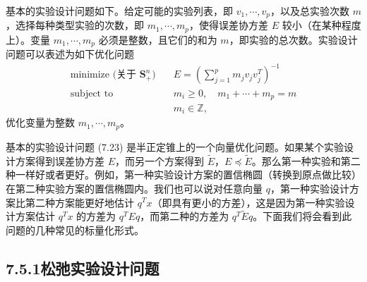 \documentclass[UTF8,12pt,a4paper,fontset=fandol]{ctexart}
\begin{document}
基本的实验设计问题如下。给定可能的实验列表，即 $v_1,\cdots,v_p$，以及总实验次数 $m$，选择每种类型实验的次数，即 $m_1,\cdots,m_p$，使得误差协方差 $E$ 较小（在某种程度上）。变量 $m_1,\cdots,m_p$ 必须是整数，且它们的和为 $m$，即实验的总次数。实验设计问题可以表述为如下优化问题
\begin{equation}
\begin{aligned}
\text{minimize (关于 $\mathbf{S}_+^n$)}\quad & E=\left(\sum_{j=1}^p m_jv_jv_j^T\right)^{-1}\\
\text{subject to}\quad & m_i\geq 0,\quad m_1+\cdots+m_p=m\\
& m_i\in\mathbb{Z},
\end{aligned}
\tag{7.23}
\end{equation}
优化变量为整数 $m_1,\cdots,m_p$。

基本的实验设计问题 (7.23) 是半正定锥上的一个向量优化问题。如果某个实验设计方案得到误差协方差 $E$，而另一个方案得到 $\tilde{E}$，$E\preceq \tilde{E}$。那么第一种实验和第二种一样好或者更好。例如，第一种实验设计方案的置信椭圆（转换到原点做比较）在第二种实验方案的置信椭圆内。我们也可以说对任意向量 $q$，第一种实验设计方案比第二种方案能更好地估计 $q^Tx$（即具有更小的方差），这是因为第一种实验设计方案估计 $q^Tx$ 的方差为 $q^TEq$，而第二种的方差为 $q^T\tilde{E}q$。下面我们将会看到此问题的几种常见的标量化形式。

\subsection*{7.5.1\quad 松弛实验设计问题}
\end{document}
